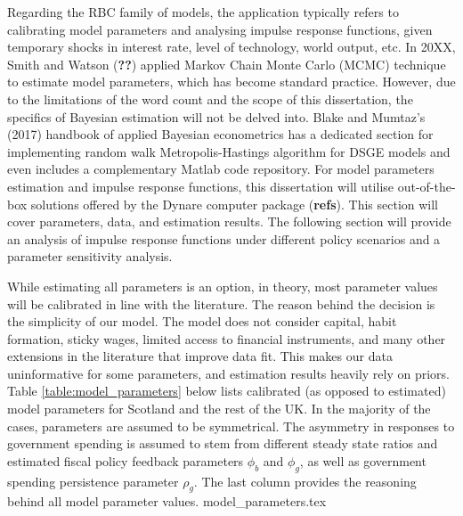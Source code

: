 Regarding the RBC family of models, the application typically refers to calibrating model parameters and analysing impulse response functions, given temporary shocks in interest rate, level of technology, world output, etc. In 20XX, Smith and Watson (\textbf{??}) applied Markov Chain Monte Carlo (MCMC) technique to estimate model parameters, which has become standard practice. However, due to the limitations of the word count and the scope of this dissertation, the specifics of Bayesian estimation will not be delved into. Blake and Mumtaz's (2017) handbook of applied Bayesian econometrics has a dedicated section for implementing random walk Metropolis-Hastings algorithm for DSGE models and even includes a complementary Matlab code repository. For model parameters estimation and impulse response functions, this dissertation will utilise out-of-the-box solutions offered by the Dynare computer package (\textbf{refs}). This section will cover parameters, data, and estimation results. The following section will provide an analysis of impulse response functions under different policy scenarios and a parameter sensitivity analysis.

While estimating all parameters is an option, in theory, most parameter values will be calibrated in line with the literature. The reason behind the decision is the simplicity of our model. The model does not consider capital, habit formation, sticky wages, limited access to financial instruments, and many other extensions in the literature that improve data fit. This makes our data uninformative for some parameters, and estimation results heavily rely on priors. Table \ref{table:model_parameters} below lists calibrated (as opposed to estimated) model parameters for Scotland and the rest of the UK. In the majority of the cases, parameters are assumed to be symmetrical. The asymmetry in responses to government spending is assumed to stem from different steady state ratios and estimated fiscal policy feedback parameters $\phi_b$ and $\phi_g$, as well as government spending persistence parameter $\rho_g$. The last column provides the reasoning behind all model parameter values.
{model_parameters.tex}

